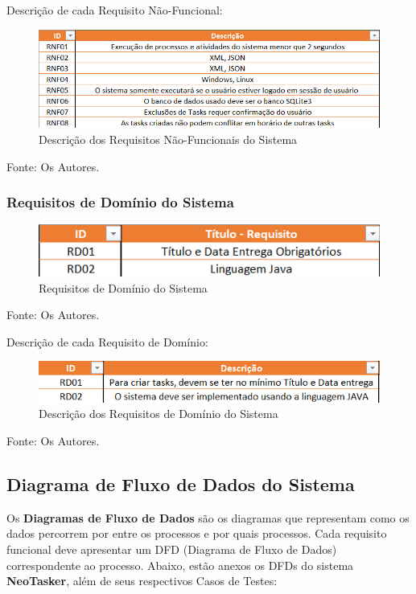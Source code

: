\documentclass[a4paper,12pt]{article}
\begin{document}
Descrição de cada Requisito Não-Funcional:
\begin{figure}[H]
	\centering
	\includegraphics[scale=0.80]{requirements/not-functionals/description.png}
	\caption{Descrição dos Requisitos Não-Funcionais do Sistema}
\end{figure}
\noindent Fonte: Os Autores.


\subsubsection{Requisitos de Domínio do Sistema}
\begin{figure}[H]
	\centering
	\includegraphics[scale=0.80]{requirements/domain/domain.png}
	\caption{Requisitos de Domínio do Sistema}
\end{figure}
\noindent Fonte: Os Autores.


Descrição de cada Requisito de Domínio:
\begin{figure}[H]
	\centering
	\includegraphics[scale=0.80]{requirements/domain/description.png}
	\caption{Descrição dos Requisitos de Domínio do Sistema}
\end{figure}
\noindent Fonte: Os Autores.

\subsection{Diagrama de Fluxo de Dados do Sistema}
Os \textbf{Diagramas de Fluxo de Dados} são os diagramas que representam como os dados percorrem por entre os processos e por quais processos. 
Cada requisito funcional deve apresentar um DFD (Diagrama de Fluxo de Dados) correspondente ao processo. Abaixo, estão anexos os DFDs do sistema \textbf{NeoTasker}, 
além de seus respectivos Casos de Testes:
\end{document}
